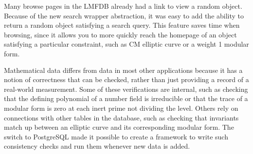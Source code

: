 \documentclass{article}
\begin{document}
Many browse pages in the LMFDB already had a link to view a random object.
Because of the new search wrapper abstraction, it was easy to add the ability to return a random object satisfying a search query.
This feature saves time when browsing, since it allows you to more quickly reach the homepage of an object satisfying a particular constraint, such as CM elliptic curve or a weight 1 modular form.

Mathematical data differs from data in most other applications because it has a notion of correctness that can be checked, rather than just providing a record of a real-world measurement.
Some of these verifications are internal, such as checking that the defining polynomial of a number field is irreducible or that the trace of a modular form is zero at each inert prime not dividing the level.
Others rely on connections with other tables in the database, such as checking that invariants match up between an elliptic curve and its corresponding modular form.
The switch to PostgreSQL made it possible to create a framework to write such consistency checks and run them whenever new data is added.
\end{document}
